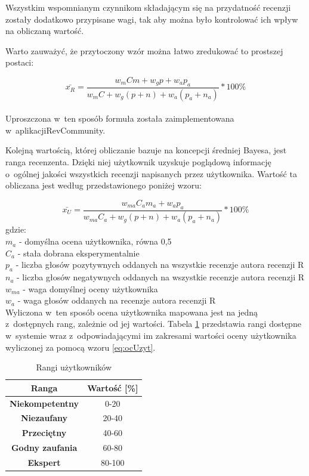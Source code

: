 Wszystkim wspomnianym czynnikom składającym się na przydatność recenzji zostały dodatkowo przypisane wagi, tak aby można było kontrolować ich wpływ na obliczaną wartość.

Warto zauważyć, że przytoczony wzór można łatwo zredukować to prostszej postaci:

\begin{equation}\label{eq:przydatnosc}
\bar{x_{R}}=\frac{w_{m}Cm+w_{g}{p}+w_{a}p_{a}}{w_{m}C+w_{g}(p+n)+w_{a}(p_{a}+n_{a})}*100\%
\end{equation}\\

Uproszczona w~ten sposób formuła została zaimplementowana w~aplikacji\linebreak RevCommunity.

Kolejną wartością, której obliczanie bazuje na koncepcji średniej Bayesa, jest ranga recenzenta. Dzięki niej użytkownik uzyskuje poglądową informację o~ogólnej jakości wszystkich recenzji napisanych przez użytkownika. Wartość ta obliczana jest według przedstawionego poniżej wzoru:

\begin{equation}\label{eq:ocUzyt}
\bar{x_{U}}=\frac{w_{ma}C_{a}m_{a}+w_{a}p_{a}}{w_{ma}C_{a}+w_{g}(p+n)+w_{a}(p_{a}+n_{a})}*100\%
\end{equation}
gdzie:\\
$m_{a}$ - domyślna ocena użytkownika, równa 0,5\\
$C_{a}$ - stała dobrana eksperymentalnie\\
$p_{a}$ - liczba głosów pozytywnych oddanych na wszystkie recenzje autora recenzji R\\
$n_{a}$ - liczba głosów negatywnych oddanych na wszystkie recenzje autora recenzji R\\
$w_{ma}$ - waga domyślnej oceny użytkownika\\
$w_{a}$ - waga głosów oddanych na recenzje autora recenzji R\\

Wyliczona w~ten sposób ocena użytkownika mapowana jest na jedną z~dostępnych rang, zależnie od jej wartości. Tabela \ref{tab:rangi} przedstawia rangi dostępne w~systemie wraz z~odpowiadającymi im zakresami wartości oceny użytkownika wyliczonej za pomocą wzoru \ref{eq:ocUzyt}.

\begin{table}[H]
\centering
\begin{tabular}{|c||c|}  
\hline
\textbf{Ranga} & \textbf{Wartość [\%]} \\
\hline\hline
\textbf{Niekompetentny} & 0-20 \\  
\hline
\textbf{Niezaufany} & 20-40 \\  
\hline
\textbf{Przeciętny} & 40-60 \\  
\hline
\textbf{Godny zaufania} & 60-80 \\  
\hline
\textbf{Ekspert} & 80-100 \\  
\hline
\end{tabular}
\caption{Rangi użytkowników}\label{tab:rangi}
\end{table}


